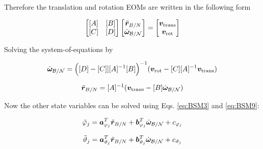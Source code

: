 \documentclass[]{BasiliskReportMemo}
\begin{document}
	Therefore the translation and rotation EOMs are written in the following form
	
	\begin{equation}
	\begin{bmatrix}
	[A] & [B]\\
	[C] & [D]
	\end{bmatrix} \begin{bmatrix}
	\ddot{\bm r}_{B/N}\\
	\dot{\bm\omega}_{\cal B/N}
	\end{bmatrix} = \begin{bmatrix}
	\bm v_{\text{trans}}\\
	\bm v_{\text{rot}}
	\end{bmatrix}
	\end{equation}

	Solving the system-of-equations by
	
	\begin{equation}
	\dot{\bm\omega}_{\cal B/N} = \Big([D] - [C]][A]^{-1}[B]\Big)^{-1}(\bm v_{\text{rot}} - [C][A]^{-1}\bm v_{\text{trans}})
	\label{eq:finalsystemomega}
	\end{equation}
	
	\begin{equation}
	\ddot{\bm r}_{B/N} = [A]^{-1} (\bm v_{\text{trans}} - [B]\dot{\bm\omega}_{\cal B/N})
	\label{eq:finalsystemr}
	\end{equation}
	
	Now the other state variables can be solved using Eqs. \eqref{eq:BSM3} and \eqref{eq:BSM9}: 
	
	\begin{equation}
	\ddot{\varphi}_j  = \bm a_{\varphi_j}^T \ddot{\bm{r}}_{B/N} + \bm b_{\varphi_j}^T \dot{\bm\omega}_{\cal B/N} +c_{\varphi_j}
	\end{equation}
		
	\begin{equation}
	\ddot \vartheta_j = \bm a_{\vartheta_j}^T \ddot{\bm r}_{B/N} + \bm b_{\vartheta_j}^T \dot{\bm\omega}_{\cal B/N} + c_{\vartheta_j}
	\end{equation}\\
\end{document}
